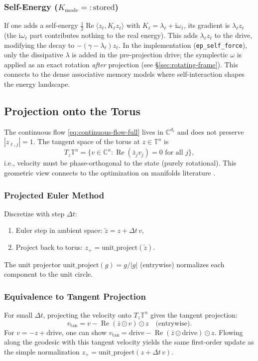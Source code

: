 \documentclass[11pt]{article}
\newcommand{\C}{\mathbb{C}}
\newcommand{\T}{\mathbb{T}}
\newcommand{\im}{\mathrm{i}}
\newcommand{\dt}{\Delta t}
\newcommand{\unitproject}{\mathrm{unit\_project}}
\DeclareMathOperator{\Real}{Re}
\begin{document}
\subsubsection{Self-Energy ($K_{\text{mode}}=:\text{stored}$)}
If one adds a self-energy $\frac{1}{2}\Real\langle z_\ell, K_\ell z_\ell \rangle$ with $K_\ell = \lambda_\ell + \im\omega_\ell$, its gradient is $\lambda_\ell z_\ell$ (the $\im\omega_\ell$ part contributes nothing to the real energy). This adds $\lambda_\ell z_\ell$ to the drive, modifying the decay to $-(\gamma - \lambda_\ell)z_\ell$. In the implementation (\texttt{ep\_self\_force}), only the dissipative $\lambda$ is added in the pre-projection drive; the symplectic $\omega$ is applied as an exact rotation \emph{after} projection (see §\ref{sec:rotating-frame}). This connects to the dense associative memory models \citep{krotov2016dense} where self-interaction shapes the energy landscape.

\subsection{Projection onto the Torus}\label{ssec:projection-full}

The continuous flow \eqref{eq:continuous-flow-full} lives in $\C^{d_\ell}$ and does not preserve $|z_{\ell,j}|=1$. The tangent space of the torus at $z \in \T^n$ is
\begin{equation}
T_z\T^n = \{ v \in \C^n : \Real(\bar{z}_j v_j) = 0 \text{ for all } j \},
\end{equation}
i.e., velocity must be phase-orthogonal to the state (purely rotational). This geometric view connects to the optimization on manifolds literature \citep{olin2021deep}.

\subsubsection{Projected Euler Method}
Discretize with step $\dt$:
\begin{enumerate}
\item Euler step in ambient space: $\tilde{z} = z + \dt\, v$,
\item Project back to torus: $z_+ = \unitproject(\tilde{z})$.
\end{enumerate}
The unit projector $\unitproject(g) = g/|g|$ (entrywise) normalizes each component to the unit circle.

\subsubsection{Equivalence to Tangent Projection}
For small $\dt$, projecting the velocity onto $T_z\T^n$ gives the tangent projection:
\begin{equation}
v_{\text{tan}} = v - \Real(\bar{z} \odot v) \odot z \quad\text{(entrywise)}.
\end{equation}
For $v = -z + \text{drive}$, one can show $v_{\text{tan}} = \text{drive} - \Real(\bar{z} \odot \text{drive}) \odot z$. Flowing along the geodesic with this tangent velocity yields the same first-order update as the simple normalization $z_+ = \unitproject(z + \dt\, v)$.
\end{document}
